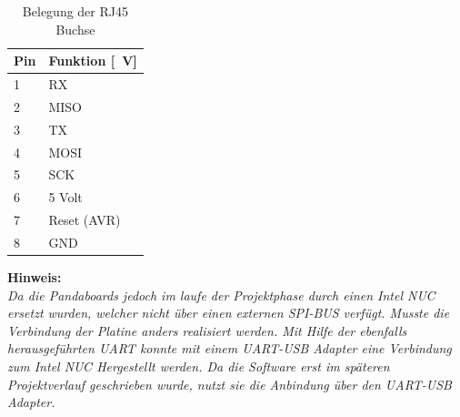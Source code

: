 \begin{table}[H]
  \centering
  \begin{tabularx}{\textwidth}{|l|X|}
    \hline
     Pin & Funktion [\SI{}{\V}]  \\ \hline \hline
     1 & RX \\ \hline
     2 & MISO \\ \hline
     3 & TX \\ \hline
     4 & MOSI \\ \hline
     5 & SCK \\ \hline
     6 & 5 Volt \\ \hline
     7 & Reset (AVR) \\ \hline
     8 & GND \\ \hline
  \end{tabularx}
  \caption{Belegung der RJ45 Buchse}%
  \label{tab:rj45}
\end{table}

\begin{minipage}{0.9\textwidth}
\textbf{Hinweis:\\}
\emph{Da die Pandaboards jedoch im laufe der Projektphase durch einen Intel NUC ersetzt wurden, welcher nicht über einen externen SPI-BUS verfügt.
Musste die Verbindung der Platine anders realisiert werden. Mit Hilfe der ebenfalls herausgeführten UART konnte mit einem UART-USB Adapter eine
Verbindung zum Intel NUC Hergestellt werden. Da die Software erst im späteren Projektverlauf geschrieben wurde, nutzt sie die Anbindung über 
den UART-USB Adapter.}
\end{minipage}

